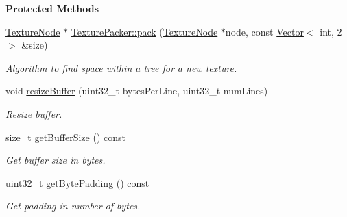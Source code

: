 \begin{Indent}\textbf{ Protected Methods}\par
\begin{DoxyCompactItemize}
\item 
\mbox{\label{classrev_1_1_texture_packer_a7b1006ce2eaf9b091877b6f59f417d72}} 
\mbox{\hyperlink{structrev_1_1_texture_node}{Texture\+Node}} $\ast$ \mbox{\hyperlink{classrev_1_1_texture_packer_a7b1006ce2eaf9b091877b6f59f417d72}{Texture\+Packer\+::pack}} (\mbox{\hyperlink{structrev_1_1_texture_node}{Texture\+Node}} $\ast$node, const \mbox{\hyperlink{classrev_1_1_vector}{Vector}}$<$ int, 2 $>$ \&size)
\begin{DoxyCompactList}\small\item\em Algorithm to find space within a tree for a new texture. \end{DoxyCompactList}\item 
\mbox{\label{classrev_1_1_texture_packer_adf480d9eae2fdf9d027995f935cc83b5}} 
void \mbox{\hyperlink{classrev_1_1_texture_packer_adf480d9eae2fdf9d027995f935cc83b5}{resize\+Buffer}} (uint32\+\_\+t bytes\+Per\+Line, uint32\+\_\+t num\+Lines)
\begin{DoxyCompactList}\small\item\em Resize buffer. \end{DoxyCompactList}\item 
\mbox{\label{classrev_1_1_texture_packer_a18cb4a8bde2c46147f73ff48509f5a8a}} 
size\+\_\+t \mbox{\hyperlink{classrev_1_1_texture_packer_a18cb4a8bde2c46147f73ff48509f5a8a}{get\+Buffer\+Size}} () const
\begin{DoxyCompactList}\small\item\em Get buffer size in bytes. \end{DoxyCompactList}\item 
\mbox{\label{classrev_1_1_texture_packer_a7b5a17a9b8df7b857f1310ce6afa0a5c}} 
uint32\+\_\+t \mbox{\hyperlink{classrev_1_1_texture_packer_a7b5a17a9b8df7b857f1310ce6afa0a5c}{get\+Byte\+Padding}} () const
\begin{DoxyCompactList}\small\item\em Get padding in number of bytes. \end{DoxyCompactList}\end{DoxyCompactItemize}
\end{Indent}
